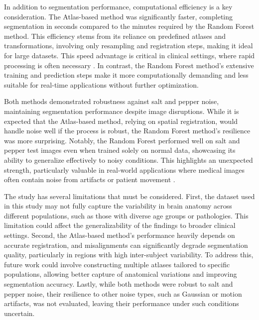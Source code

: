 In addition to segmentation performance, computational efficiency is a key consideration. The Atlas-based method was significantly faster, completing segmentation in seconds compared to the minutes required by the Random Forest method. This efficiency stems from its reliance on predefined atlases and transformations, involving only resampling and registration steps, making it ideal for large datasets. This speed advantage is critical in clinical settings, where rapid processing is often necessary \cite{b19}. In contrast, the Random Forest method’s extensive training and prediction steps make it more computationally demanding and less suitable for real-time applications without further optimization.


Both methods demonstrated robustness against salt and pepper noise, maintaining segmentation performance despite image disruptions. While it is expected that the Atlas-based method, relying on spatial registration, would handle noise well if the process is robust, the Random Forest method's resilience was more surprising. Notably, the Random Forest performed well on salt and pepper test images even when trained solely on normal data, showcasing its ability to generalize effectively to noisy conditions. This highlights an unexpected strength, particularly valuable in real-world applications where medical images often contain noise from artifacts or patient movement \cite{b20}.

The study has several limitations that must be considered. First, the dataset used in this study may not fully capture the variability in brain anatomy across different populations, such as those with diverse age groups or pathologies. This limitation could affect the generalizability of the findings to broader clinical settings. Second, the Atlas-based method’s performance heavily depends on accurate registration, and misalignments can significantly degrade segmentation quality, particularly in regions with high inter-subject variability. To address this, future work could involve constructing multiple atlases tailored to specific populations, allowing better capture of anatomical variations and improving segmentation accuracy. Lastly, while both methods were robust to salt and pepper noise, their resilience to other noise types, such as Gaussian or motion artifacts, was not evaluated, leaving their performance under such conditions uncertain.